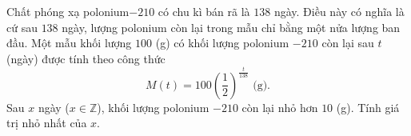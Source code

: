 \begin{bt}%
	Chất phóng xạ polonium$-210$ có chu kì bán rã là $138$ ngày. Điều này có nghĩa là cứ sau $138$ ngày, lượng polonium còn lại trong mẫu chỉ bằng một nửa lượng ban đầu.	
	Một mẫu khối lượng $100$ (g) có khối lượng polonium $- 210$ còn lại sau $t$ (ngày) được tính theo công thức
	$$M(t) = 100 \left(\frac{1}{2}\right)^{\frac{t}{138}} \text{ (g)}.$$
	Sau $x$ ngày ($x \in \mathbb{Z}$), khối lượng polonium $- 210$ còn lại nhỏ hơn $10$ (g). Tính giá trị nhỏ nhất của $x$.
\end{bt}

